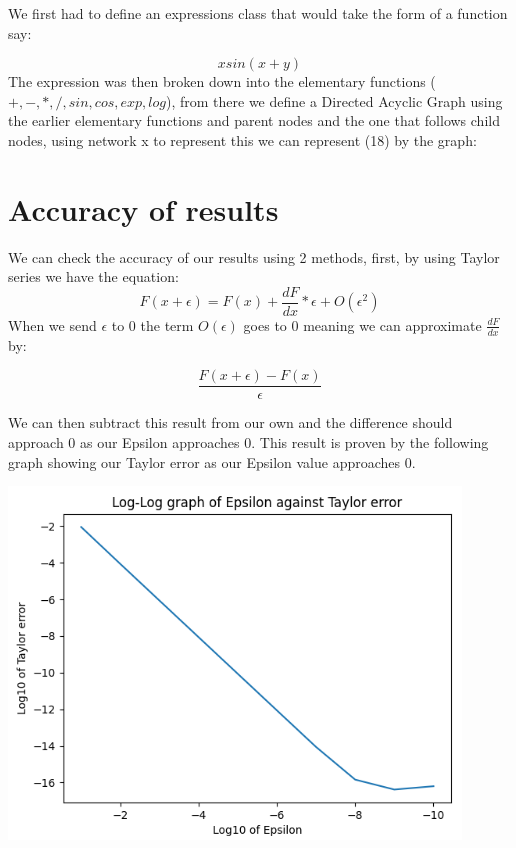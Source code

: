 \documentclass{article}
\begin{document}
We first had to define an expressions class that would take the form of a function say:



\begin{equation}
xsin(x+y)
\end{equation}
The expression was then broken down into the elementary functions ($+, -, *, /, sin, cos, exp, log$), from there we define a Directed Acyclic Graph using the earlier elementary functions and parent nodes and the one that follows child nodes, using network x to represent this we can represent (18) by the graph:

\section{Accuracy of results}

We can check the accuracy of our results using 2 methods, first, by using Taylor series we have the equation:
\begin{equation}
    F(x + \epsilon) = F(x) + \frac{dF}{dx} * \epsilon + O(\epsilon ^ 2)
\end{equation}
When we send $\epsilon$ to 0 the term $O(\epsilon)$ goes to 0 meaning we can approximate $\frac{dF}{dx}$ by:

\begin{equation}
    \frac{F(x + \epsilon) - F(x)}{\epsilon}
\end{equation}

We can then subtract this result from our own and the difference should approach 0 as our Epsilon approaches 0. This result is proven by the following graph showing our Taylor error as our Epsilon value approaches 0.

\begin{center}
    \includegraphics[width=12cm]{images/Taylor_error_1.png}
\end{center}
\end{document}
